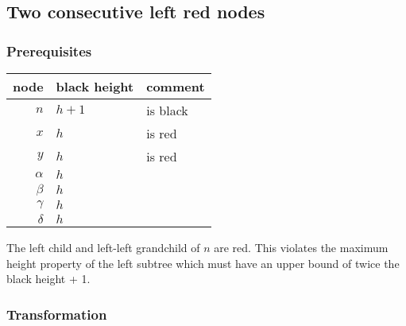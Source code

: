 \documentclass[a4paper,10pt,twoside]{article}
\begin{document}
\newpage
\subsection{Two consecutive left red nodes}

\subsubsection{Prerequisites}

\begin{center}
\begin{tabular}{|r||l|l|}
\hline
node		&	black height	&	comment	\\
\hline
\hline
$n$		&	$h+1$	&	is black	\\\hline
$x$		&	$h$	&	is red	\\\hline
$y$		&	$h$	&	is red	\\\hline
$\alpha$	&	$h$	&		\\\hline
$\beta$		&	$h$	&		\\\hline
$\gamma$	&	$h$	&		\\\hline
$\delta$	&	$h$	&		\\\hline
\end{tabular}
\end{center}

The left child and left-left grandchild of $n$ are red. This violates the
maximum height property of the left subtree which must have an upper bound of
twice the black height + 1.

\begin{center}
\end{center}

\subsubsection{Transformation}
\end{document}
